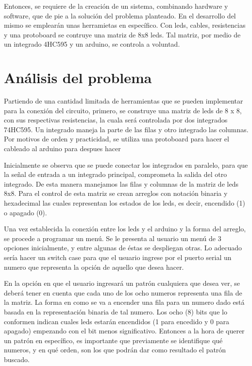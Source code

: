\documentclass{article}
\begin{document}
Entonces, se requiere de la creación de un sistema, combinando hardware y software, que de pie a la solución del problema planteado. En el desarrollo del mismo se emplearán unas herramietas en específico. Con leds, cables, resistencias y una protoboard se contruye una matriz de 8x8 leds. 
Tal matriz, por medio de un integrado 4HC595 y un arduino, se controla a voluntad. 

\section{Análisis del problema} \label{contenido}
Partiendo de una cantidad limitada de herramientas que se pueden implementar para la conexión del circuito, primero, se construye una matriz de leds de 8 x 8, con sus respectivas resistencias, la cuala será controlada por dos integrados 74HC595. Un integrado maneja la parte de las filas y otro integrado las columnas. Por motivos de orden y practicidad, se utiliza una protoboard para hacer el cableado al arduino para despues hacer 
\newline

Inicialmente se observa que se puede conectar los integrados en paralelo, para que la señal de entrada a un integrado principal, comprometa la salida del otro integrado. De esta manera manejamos las filas y columnas de la matriz de leds 8x8.
Para el control de esta matriz se crean arreglos con notación binaria y hexadecimal las cuales representan los estados de los leds, es decir, encendido (1) o apagado (0).
\newline

Una vez establecida la conexión entre los leds y el arduino y la forma del arreglo, se procede a programar un menú.
Se le presenta al usuario un menú de 3 opciones inicialmente, y entre algunas de éstas se despliegan otras. Lo adecuado sería hacer un switch case para que el usuario ingrese por el puerto serial un numero que representa la opción de aquello que desea hacer. 
\newline

En la opción en que el usuario ingresará un patrón cualquiera que desea ver, se deberá tener en cuenta que cada uno de los ocho numeros representa una fila de la matriz. La forma en como se va a encender una fila para un numero dado está basada en la representación binaria de tal numero. Los ocho (8) bits que lo conformen indican cuales leds estarán encendidos (1 para encedido y 0 para apagado) empezando con el bit menos significativo. 
Entonces a la hora de querer un patrón en específico, es importante que previamente se identifique qué numeros, y en qué orden, son los que podrán dar como resultado el patrón buscado. 
\end{document}
